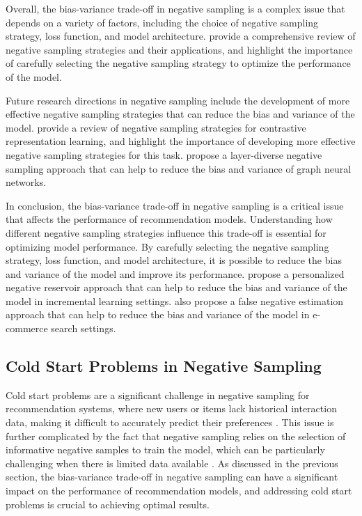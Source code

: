 \documentclass[11pt,a4paper]{article}
\begin{document}
Overall, the bias-variance trade-off in negative sampling is a complex issue that depends on a variety of factors, including the choice of negative sampling strategy, loss function, and model architecture. \cite{doi:10.1109/tpami.2024.3371473} provide a comprehensive review of negative sampling strategies and their applications, and highlight the importance of carefully selecting the negative sampling strategy to optimize the performance of the model.

Future research directions in negative sampling include the development of more effective negative sampling strategies that can reduce the bias and variance of the model. \cite{arxiv:2206.00212} provide a review of negative sampling strategies for contrastive representation learning, and highlight the importance of developing more effective negative sampling strategies for this task. \cite{arxiv:2403.11408} propose a layer-diverse negative sampling approach that can help to reduce the bias and variance of graph neural networks.

In conclusion, the bias-variance trade-off in negative sampling is a critical issue that affects the performance of recommendation models. Understanding how different negative sampling strategies influence this trade-off is essential for optimizing model performance. By carefully selecting the negative sampling strategy, loss function, and model architecture, it is possible to reduce the bias and variance of the model and improve its performance. \cite{arxiv:2403.03993} propose a personalized negative reservoir approach that can help to reduce the bias and variance of the model in incremental learning settings. \cite{doi:10.1145/3637528.3671630} also propose a false negative estimation approach that can help to reduce the bias and variance of the model in e-commerce search settings.


\subsection{Cold Start Problems in Negative Sampling}


Cold start problems are a significant challenge in negative sampling for recommendation systems, where new users or items lack historical interaction data, making it difficult to accurately predict their preferences \cite{arxiv:1608.07400}. This issue is further complicated by the fact that negative sampling relies on the selection of informative negative samples to train the model, which can be particularly challenging when there is limited data available \cite{arxiv:1707.07435}. As discussed in the previous section, the bias-variance trade-off in negative sampling can have a significant impact on the performance of recommendation models, and addressing cold start problems is crucial to achieving optimal results.
\end{document}
